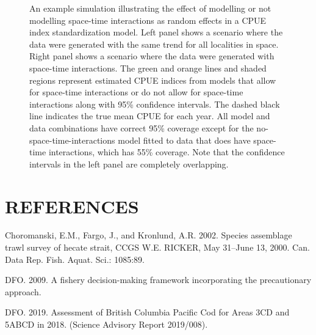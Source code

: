 \documentclass[11pt]{book}
\begin{document}
\begin{figure}[htb]

{\centering {} 

}

\caption{An example simulation illustrating the effect of modelling or not modelling space-time interactions as random effects in a CPUE index standardization model. Left panel shows a scenario where the data were generated with the same trend for all localities in space. Right panel shows a scenario where the data were generated with space-time interactions. The green and orange lines and shaded regions represent estimated CPUE indices from models that allow for space-time interactions or do not allow for space-time interactions along with 95\% confidence intervals. The dashed black line indicates the true mean CPUE for each year. All model and data combinations have correct 95\% coverage except for the no-space-time-interactions model fitted to data that does have space-time interactions, which has 55\% coverage. Note that the confidence intervals in the left panel are completely overlapping.}\label{fig:cpue-sim-test-tweedie-glmm-plot}
\end{figure}
\clearpage

\clearpage

\hypertarget{references}{%
\section*{REFERENCES}\label{references}}
{}
\noindent
\vspace{-2em}
\setlength{\parindent}{-0.2in}
\setlength{\leftskip}{0.2in}
\setlength{\parskip}{8pt}

\hypertarget{refs}{}
\leavevmode\hypertarget{ref-choromanski2002}{}%
Choromanski, E.M., Fargo, J., and Kronlund, A.R. 2002. Species assemblage trawl survey of hecate strait, CCGS W.E. RICKER, May 31--June 13, 2000. Can. Data Rep. Fish. Aquat. Sci.: 1085:89.

\leavevmode\hypertarget{ref-dfo2009}{}%
DFO. 2009. A fishery decision-making framework incorporating the precautionary approach.

\leavevmode\hypertarget{ref-dfo2019}{}%
DFO. 2019. Assessment of British Columbia Pacific Cod for Areas 3CD and 5ABCD in 2018. (Science Advisory Report 2019/008).
\end{document}
